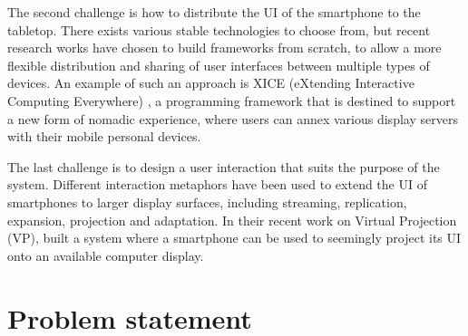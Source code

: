 The second challenge is how to distribute the UI of the smartphone to the tabletop.
There exists various stable technologies to choose from, but recent research works have chosen to build frameworks from scratch, to allow a more flexible distribution and sharing of user interfaces between multiple types of devices.
An example of such an approach is XICE (eXtending Interactive Computing Everywhere) \citep{Arthur:2011:xice}, a programming framework that is destined to support a new form of nomadic experience, where users can annex various display servers with their mobile personal devices.

The last challenge is to design a user interaction that suits the purpose of the system.
Different interaction metaphors have been used to extend the UI of smartphones to larger display surfaces, including streaming, replication, expansion, projection and adaptation.
In their recent work on Virtual Projection (VP), \cite{Baur:2012:virtualprojection} built a system where a smartphone can be used to seemingly project its UI onto an available computer display.

%
%
%
%
%
%
%
%
%
%

\section{Problem statement}

